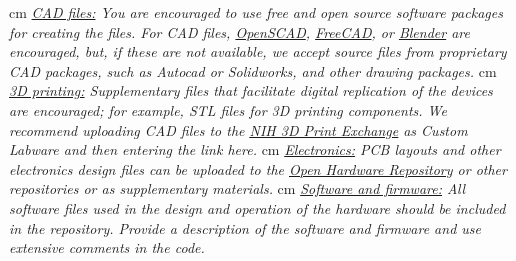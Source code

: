 \documentclass[11pt, letterpaper]{article}
\begin{document}
%
 cm
\noindent
\textit{\underline{CAD files:} You are encouraged to use free and open source software packages for creating the files. For CAD files, \href{http://www.openscad.org/}{OpenSCAD}, \href{http://www.freecadweb.org/}{FreeCAD}, or \href{https://www.blender.org/}{Blender} are encouraged, but, if these are not available, we accept source files from proprietary CAD packages, such as Autocad or Solidworks, and other drawing packages.}
 cm
\noindent
\textit{\underline{3D printing:} Supplementary files that facilitate digital replication of the devices are encouraged;  for example, STL files for 3D printing components. We recommend uploading CAD files to the \href{http://3dprint.nih.gov/}{\underline{NIH 3D Print Exchange}} as Custom Labware and then entering the link here.}
 cm
\noindent
\textit{\underline{Electronics:} PCB layouts and other electronics design files can be uploaded to the \href{http://www.ohwr.org/}{\underline{Open Hardware Repository}} or other repositories or as supplementary materials.}
 cm
\noindent
\textit{\underline{Software and firmware:} All software files used in the design and operation of the hardware should be included in the repository. Provide a description of the software and firmware and use extensive comments in the code.}
\end{document}
